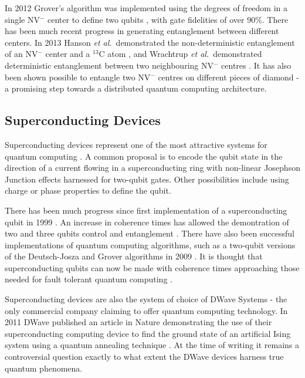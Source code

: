 In 2012 Grover's algorithm was implemented using the degrees of freedom in a single NV$^{-}$ center to define two qubits \cite{two_qubit_nv}, with gate fidelities of over 90\%. There has been much recent progress in generating entanglement between different centers. In 2013 Hanson \textit{et al.}\ demonstrated the non-deterministic entanglement of an NV$^{-}$ center and a $^{13}$C atom \cite{nv_entanglement_hanson}, and Wrachtrup \textit{et al.}\ demonstrated deterministic entanglement between two neighbouring NV$^{-}$ centres \cite{nv_entanglement_wachtrup}. It has also been shown possible to entangle two NV$^{-}$ centres on different pieces of diamond \cite{remote_nv_entanglement_hanson} - a promising step towards a distributed quantum computing architecture.  

\subsection{Superconducting Devices}

Superconducting devices represent one of the most attractive systems for quantum computing  \cite{superconducting_review_11}. A common proposal is to encode the qubit state in the direction of a current flowing in a superconducting ring with non-linear Josephson Junction \cite{josephson_junction} effects harnessed for two-qubit gates. Other possibilities include using charge or phase properties to define the qubit.

There has been much progress since first implementation of a superconducting qubit in 1999 \cite{superconducting_first_qubit}. An increase in coherence times \cite{superconducting_better_coherence_03} has allowed the demontration of two and three qubits control and entanglement \cite{ superconduction_bell_violation_09, superconducting_measurement_10}. There have also been successful implementations of quantum computing algorithms, such as a two-qubit versions of the Deutsch-Josza and Grover algorithms in 2009 \cite{two_qubit_chip_yale}.
It is thought that superconducting qubits can now be made with coherence times approaching those needed for fault tolerant quantum computing \cite{superconducting_long_coherence_11}.

Superconducting devices are also the system of choice of DWave Systems - the only commercial company claiming to offer quantum computing technology. In 2011 DWave published an article in Nature demonstrating the use of their superconducting computing device to find the ground state of an artificial Ising system using a quantum annealing technique \cite{dwave_annealing}. At the time of writing it remains a controversial question exactly to what extent the DWave devices harness true quantum phenomena.


